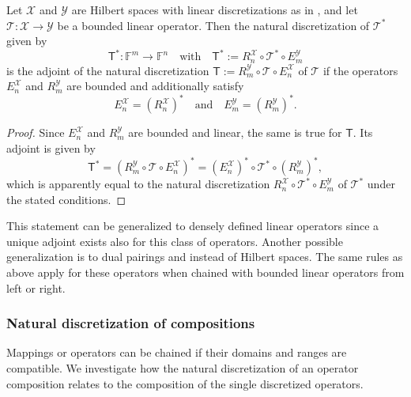 \documentclass[a4paper]{paper}
\newcommand{\Spc}[1]{\mathscr{#1}}
\newcommand{\Field}{\mathbb{F}}
\newcommand{\Op}[1]{\mathcal{#1}}
\newcommand{\DiscOp}[1]{\mathsf{#1}}
\newcommand*{\EXT}[2]{\ensuremath{E_{#1}^{#2}}}
\newcommand*{\REST}[2]{\ensuremath{R_{#1}^{#2}}}
\newcommand*{\RnX}{\ensuremath{\REST{n}{\Spc{X}}}}
\newcommand*{\RmY}{\ensuremath{\REST{m}{\Spc{Y}}}}
\newcommand*{\EnX}{\ensuremath{\EXT{n}{\Spc{X}}}}
\newcommand*{\EmY}{\ensuremath{\EXT{m}{\Spc{Y}}}}
\begin{document}
\begin{lemma}
 \label{lemma:discr:operator:op_adj:natural_is_adj}
 Let $\Spc{X}$ and $\Spc{Y}$ are Hilbert spaces with linear discretizations as in 
 , and let $\Op{T} \colon \Spc{X} \to \Spc{Y}$ be a bounded linear operator. 
 Then the natural discretization of $\Op{T}^*$ given by
 \begin{equation*}
  \DiscOp{T}^* \colon \Field^m \to \Field^n
  \quad \text{with} \quad
  \DiscOp{T}^* := \RnX \circ \Op{T}^* \circ \EmY
 \end{equation*}
 is the adjoint of the natural discretization $\DiscOp{T} := \RmY \circ \Op{T} \circ \EnX$ of $\Op{T}$ if the operators 
 $\EnX$ and $\RmY$ are bounded and additionally satisfy
 \begin{equation*}
  \EnX = (\RnX)^* \quad \text{and} \quad \EmY = (\RmY)^*.
 \end{equation*}
\end{lemma}
\vspace{1em}


\begin{proof}
 Since $\EnX$ and $\RmY$ are bounded and linear, the same is true for $\DiscOp{T}$. Its adjoint is given by
 \begin{equation*}
  \DiscOp{T}^* = (\RmY \circ \Op{T} \circ \EnX)^* = (\EnX)^* \circ \Op{T}^* \circ (\RmY)^*,
 \end{equation*}
 which is apparently equal to the natural discretization $\RnX \circ \Op{T}^* \circ \EmY$ of $\Op{T}^*$ under the 
 stated conditions.
\end{proof}

\begin{remark}
 This statement can be generalized to densely defined linear operators since a unique adjoint exists also for this 
 class of operators. Another possible generalization is to dual pairings and instead of Hilbert spaces. The same rules 
 as above apply for these operators when chained with bounded linear operators from left or right.
\end{remark}


\subsubsection{Natural discretization of compositions}
\label{subsubsec:discr:operator:op_comp}

Mappings or operators can be chained if their domains and ranges are compatible. We investigate how the natural 
discretization of an operator composition relates to the composition of the single discretized operators.
\end{document}
